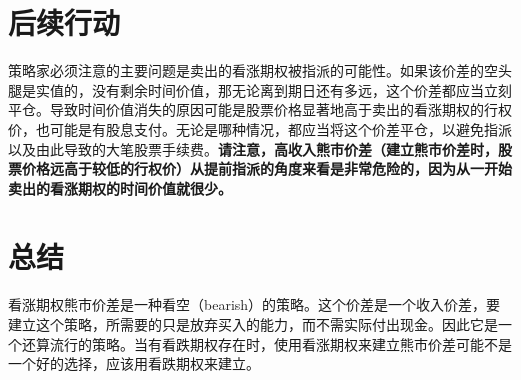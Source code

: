 \section{后续行动}
策略家必须注意的主要问题是卖出的看涨期权被指派的可能性。如果该价差的空头腿是实值的，没有剩余时间价值，那无论离到期日还有多远，这个价差都应当立刻平仓。导致时间价值消失的原因可能是股票价格显著地高于卖出的看涨期权的行权价，也可能是有股息支付。无论是哪种情况，都应当将这个价差平仓，以避免指派以及由此导致的大笔股票手续费。\textbf{请注意，高收入熊市价差（建立熊市价差时，股票价格远高于较低的行权价）从提前指派的角度来看是非常危险的，因为从一开始卖出的看涨期权的时间价值就很少。}
\section{总结}
看涨期权熊市价差是一种看空（bearish）的策略。这个价差是一个收入价差，要建立这个策略，所需要的只是放弃买入的能力，而不需实际付出现金。因此它是一个还算流行的策略。当有看跌期权存在时，使用看涨期权来建立熊市价差可能不是一个好的选择，应该用看跌期权来建立。
